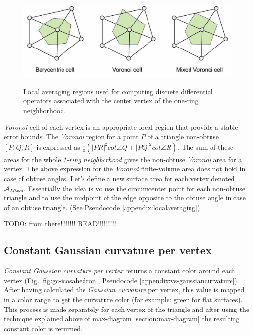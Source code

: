 \begin{figure}[!h]
    \centering
    \includegraphics[scale=0.35]{images/localregions.png}
    \label{fig:localregions}
    \caption{Local averaging regions used for computing discrete differential operators associated with the center vertex of the one-ring neighborhood. \cite{polygonmeshprocessing}}
\end{figure}
\textit{Voronoi} cell of each vertex is an appropriate local region that provide a stable error bounds.
The \textit{Voronoi} region for a point $P$ of a triangle non-obtuse $[P, Q, R]$ is expressed as $\frac{1}{8}(| PR|^2 cot \angle Q + |PQ |^2 cot \angle R)$. The sum of these areas for the whole \textit{1-ring neighborhood} gives the non-obtuse \textit{Voronoi} area for a vertex. The above expression for the \textit{Voronoi} finite-volume area does not hold in case of obtuse angles. Let's define a new surface area for each vertex denoted $\mathcal{A}_{Mixed}$. Essentially the idea is yo use the circumcenter point for each non-obtuse triangle and to use the midpoint of the edge opposite to the obtuse angle in case of an obtuse triangle. (See Pseudocode \ref{appendix:localaveraging}). \cite{meshlab}

TODO: from there!!!!!!!! READ!!!!!!!!!!

\subsection{Constant Gaussian curvature per vertex}
\textit{Constant Gaussian curvature per vertex} returns a constant color around each vertex (Fig. \ref{fig:gc-icosahedron}, Pseudocode \ref{appendix:vs-gaussiancurvature}). After having calculated the \textit{Gaussian curvature} per vertex, this value is mapped in a color range to get the curvature color (for example: green for flat surfaces). This process is made separately for each vertex of the triangle and after using the technique explained above of max-diagram \ref{section:max-diagram} the resulting constant color is returned.

